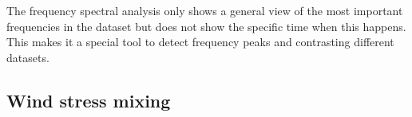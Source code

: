 \documentclass[tesis.tex]{subfiles}
\begin{document}
The frequency spectral analysis only shows a general view of the most important frequencies in the dataset but does not show the specific time when this happens. This makes it a special tool to detect frequency peaks and contrasting different datasets.\\

\subsection{Wind stress mixing}



\end{document}
